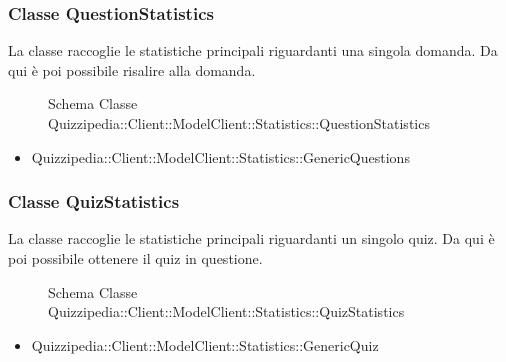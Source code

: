 \subsubsection{Classe QuestionStatistics}
La classe raccoglie le statistiche principali riguardanti una singola domanda. Da qui è poi possibile risalire alla domanda.
\begin{figure}[H]
\centering
\noindent{}
\caption[Schema Classe QuestionStatistics]{Schema Classe Quizzipedia::Client::ModelClient::Statistics::QuestionStatistics}
\end{figure}
\begin{itemize}
\item Quizzipedia::Client::ModelClient::Statistics::GenericQuestions
\end{itemize}
\subsubsection{Classe QuizStatistics}
La classe raccoglie le statistiche principali riguardanti un singolo quiz. Da qui è poi possibile ottenere il quiz in questione.
\begin{figure}[H]
\centering
\noindent{}
\caption[Schema Classe QuizStatistics]{Schema Classe Quizzipedia::Client::ModelClient::Statistics::QuizStatistics}
\end{figure}
\begin{itemize}
\item Quizzipedia::Client::ModelClient::Statistics::GenericQuiz
\end{itemize}
